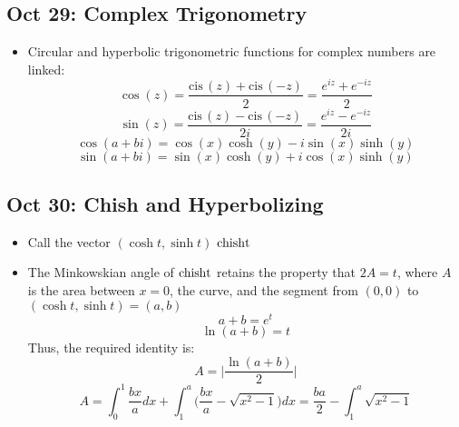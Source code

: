 \documentclass[10pt, oneside]{article}
\newcommand{\cis}{\text{cis} \,}
\begin{document}
\subsection{Oct 29: Complex Trigonometry}
\begin{itemize}
    \item Circular and hyperbolic trigonometric functions for complex numbers are linked:
        \[\cos(z) = \frac{\cis(z) + \cis(-z)}{2} = \frac{e^{iz} + e^{-iz}}{2}\]
        \[\sin(z) = \frac{\cis(z) - \cis(-z)}{2i} = \frac{e^{iz} - e^{-iz}}{2i}\]
        \[\cos(a + bi) = \cos(x) \cosh(y) - i\sin(x)\sinh(y)\]
        \[\sin(a + bi) = \sin(x) \cosh(y) + i\cos(x)\sinh(y)\]
\end{itemize}

\subsection{Oct 30: Chish and Hyperbolizing}
\begin{itemize}
    \item Call the vector $(\cosh t, \sinh t)$ $\rm{chish } t$
    \item The Minkowskian angle of $\rm{chish } t$ retains the property that $2A = t$, where $A$ is the area between $x = 0$, the curve, and the segment from $(0,0)$ to $(\cosh t, \sinh t) = (a,b)$
        \[a + b = e^t\]
        \[\ln(a + b) = t\]
        Thus, the required identity is:
        \[A = \bigg| \frac{\ln(a+b)}{2} \bigg|\]
        \[A = \int^1_0 \frac{bx}{a} dx + \int^a_1 \Big( \frac{bx}{a} - \sqrt{x^2 - 1} \Big) dx = \frac{ba}{2} - \int^a_1 \sqrt{x^2 - 1}\]
\end{itemize}
\end{document}

